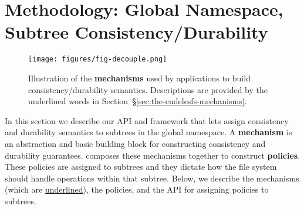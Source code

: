 \section{Methodology: Global Namespace, Subtree Consistency/Durability}
\label{sec:methodology-decoupled-namespaces}

\begin{figure}[tb]
\centering
\texttt{[image: figures/fig-decouple.png]}
\caption{Illustration of the \textbf{mechanisms} used by applications to build
consistency/durability semantics. Descriptions are provided by the
underlined words in Section~\S\ref{sec:the-cudelesfs-mechanisms}.
}\label{fig:decouple}
\end{figure}


In this section we describe our API and framework that lets
 assign consistency and durability
semantics to subtrees in the global namespace. A \textbf{mechanism} is an
abstraction and basic building block for constructing consistency and
durability guarantees.  composes these mechanisms together to
construct \textbf{policies}.  These policies are assigned to subtrees and they
dictate how the file system should handle operations within that subtree.
Below, we describe the mechanisms (which are \underline{underlined}), the
policies, and the API for assigning policies to subtrees.

